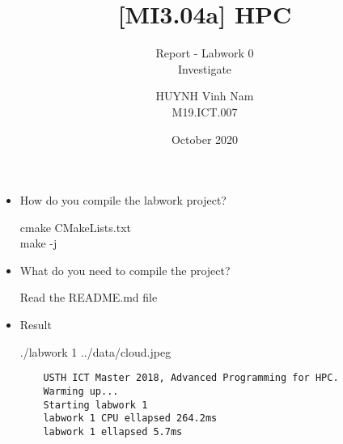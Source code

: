 \documentclass[10pt, a4paper]{article}
\title{[MI3.04a] HPC}
\subtitle{Report - Labwork 0 \\ Investigate}
\author{HUYNH Vinh Nam \\ M19.ICT.007}
\date{October 2020}
\begin{document}
\maketitle

\begin{itemize}
    \item How do you compile the labwork project?
    
    \vspace{1mm}
    cmake CMakeLists.txt \\
    make -j
    \item What do you need to compile the project?
	
	\vspace{1mm}
	Read the README.md file
    \item Result 
    
    \vspace{1mm}
    ./labwork 1 ../data/cloud.jpeg
    \begin{verbatim}
    USTH ICT Master 2018, Advanced Programming for HPC. 
    Warming up... 
    Starting labwork 1
    labwork 1 CPU ellapsed 264.2ms
    labwork 1 ellapsed 5.7ms
        
    \end{verbatim}
    
\end{itemize}
\end{document}
